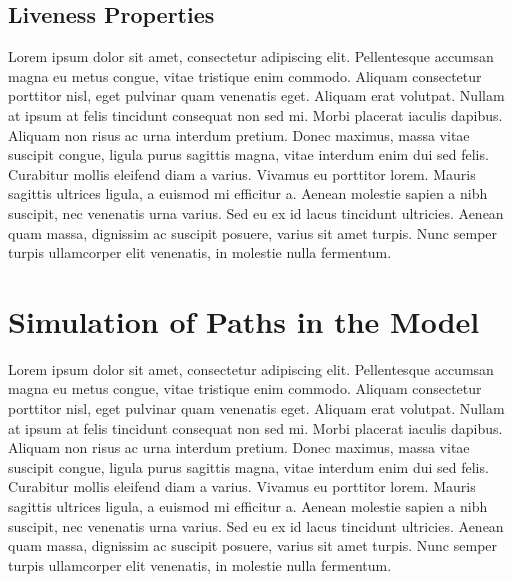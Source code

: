 \subsection{Liveness Properties}

Lorem ipsum dolor sit amet, consectetur adipiscing elit. Pellentesque accumsan magna eu metus congue, vitae tristique enim commodo. Aliquam consectetur porttitor nisl, eget pulvinar quam venenatis eget. Aliquam erat volutpat. Nullam at ipsum at felis tincidunt consequat non sed mi. Morbi placerat iaculis dapibus. Aliquam non risus ac urna interdum pretium. Donec maximus, massa vitae suscipit congue, ligula purus sagittis magna, vitae interdum enim dui sed felis. Curabitur mollis eleifend diam a varius. Vivamus eu porttitor lorem. Mauris sagittis ultrices ligula, a euismod mi efficitur a. Aenean molestie sapien a nibh suscipit, nec venenatis urna varius. Sed eu ex id lacus tincidunt ultricies. Aenean quam massa, dignissim ac suscipit posuere, varius sit amet turpis. Nunc semper turpis ullamcorper elit venenatis, in molestie nulla fermentum.

\section{Simulation of Paths in the Model}
\label{sec:simulator}

Lorem ipsum dolor sit amet, consectetur adipiscing elit. Pellentesque accumsan magna eu metus congue, vitae tristique enim commodo. Aliquam consectetur porttitor nisl, eget pulvinar quam venenatis eget. Aliquam erat volutpat. Nullam at ipsum at felis tincidunt consequat non sed mi. Morbi placerat iaculis dapibus. Aliquam non risus ac urna interdum pretium. Donec maximus, massa vitae suscipit congue, ligula purus sagittis magna, vitae interdum enim dui sed felis. Curabitur mollis eleifend diam a varius. Vivamus eu porttitor lorem. Mauris sagittis ultrices ligula, a euismod mi efficitur a. Aenean molestie sapien a nibh suscipit, nec venenatis urna varius. Sed eu ex id lacus tincidunt ultricies. Aenean quam massa, dignissim ac suscipit posuere, varius sit amet turpis. Nunc semper turpis ullamcorper elit venenatis, in molestie nulla fermentum.
